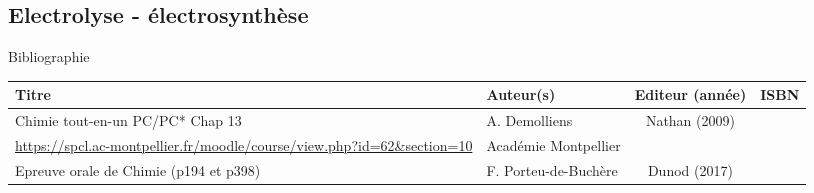 \begin{headerBlock}
\chapter{Electrolyse - électrosynthèse}
\label{LC_Electrolyse_SPCL}
 \end{headerBlock}



\begin{reportBlock}{Bibliographie}

\begin{center}
\begin{tabularx}{\textwidth}{| X | X | c | c |}\hline
Titre & Auteur(s) & Editeur (année) & ISBN \\ \hline
 Chimie tout-en-un PC/PC* Chap 13 & A. Demolliens & Nathan (2009) &  \\ 
 \hline
 \url{https://spcl.ac-montpellier.fr/moodle/course/view.php?id=62&section=10} & Académie Montpellier & & \\
 \hline
 Epreuve orale de Chimie (p194 et p398) & F. Porteu-de-Buchère & Dunod (2017) &  \\
 \hline
\end{tabularx}
\end{center}

\end{reportBlock}

